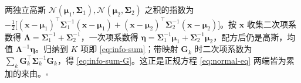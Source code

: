 \begin{derivation}
两独立高斯 $\mathcal{N}(\boldsymbol{\mu}_1,\boldsymbol{\Sigma}_1),\mathcal{N}(\boldsymbol{\mu}_2,\boldsymbol{\Sigma}_2)$ 之积的指数为 $-\tfrac12\big[(\mathbf{x}-\boldsymbol{\mu}_1)^\top\boldsymbol{\Sigma}_1^{-1}(\mathbf{x}-\boldsymbol{\mu}_1)+(\mathbf{x}-\boldsymbol{\mu}_2)^\top\boldsymbol{\Sigma}_2^{-1}(\mathbf{x}-\boldsymbol{\mu}_2)\big]$。按 $\mathbf{x}$ 收集二次项系数得 $\boldsymbol{\Lambda}=\boldsymbol{\Sigma}_1^{-1}+\boldsymbol{\Sigma}_2^{-1}$，一次项系数得 $\boldsymbol{\eta}=\boldsymbol{\Sigma}_1^{-1}\boldsymbol{\mu}_1+\boldsymbol{\Sigma}_2^{-1}\boldsymbol{\mu}_2$，配方后仍是高斯，均值 $\boldsymbol{\Lambda}^{-1}\boldsymbol{\eta}$。归纳到 $K$ 项即 \cref{eq:info-sum}；带映射 $\mathbf{G}_k$ 时二次项系数为 $\sum_k\mathbf{G}_k^\top\boldsymbol{\Sigma}_k^{-1}\mathbf{G}_k$，得 \cref{eq:info-sum-G}。这正是正规方程 \cref{eq:normal-eq} 两端皆为累加的来由。\hfill$\square$
\end{derivation}

